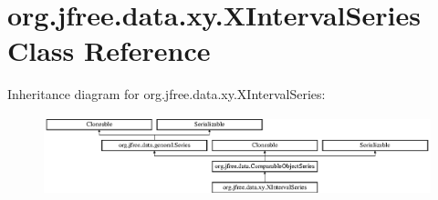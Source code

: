 \hypertarget{classorg_1_1jfree_1_1data_1_1xy_1_1_x_interval_series}{}\section{org.\+jfree.\+data.\+xy.\+X\+Interval\+Series Class Reference}
\label{classorg_1_1jfree_1_1data_1_1xy_1_1_x_interval_series}
Inheritance diagram for org.\+jfree.\+data.\+xy.\+X\+Interval\+Series\+:\begin{figure}[H]
\begin{center}
\leavevmode
\includegraphics[height=2.314049cm]{classorg_1_1jfree_1_1data_1_1xy_1_1_x_interval_series}
\end{center}
\end{figure}
